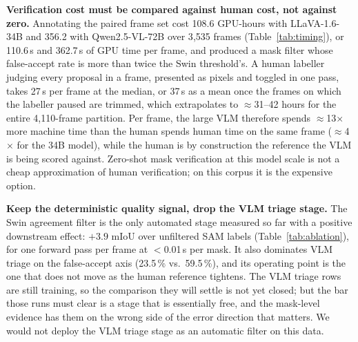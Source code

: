 \documentclass[conference]{IEEEtran}
\begin{document}
\textbf{Verification cost must be compared against human cost, not against zero.}
Annotating the paired frame set cost 108.6 GPU-hours with LLaVA-1.6-34B and 356.2 with
Qwen2.5-VL-72B over 3{,}535 frames (Table~\ref{tab:timing}), or 110.6\,s and 362.7\,s of GPU time per
frame, and produced a mask filter whose false-accept rate is more than twice the Swin threshold's.
A human labeller judging every proposal in a frame, presented as pixels and toggled in one pass, takes
27\,s per frame at the median, or 37\,s as a mean once the frames on which the labeller paused are
trimmed, which extrapolates to $\approx$31--42 hours for the entire 4{,}110-frame partition.
Per frame, the large VLM therefore spends $\approx$13$\times$ more machine time than the human
spends human time on the same frame ($\approx$4$\times$ for the 34B model), while the human is
by construction the reference the VLM is being scored against. Zero-shot mask verification at this model scale is not a cheap approximation of human
verification; on this corpus it is the expensive option.

\textbf{Keep the deterministic quality signal, drop the VLM triage stage.}
The Swin agreement filter is the only automated stage measured so far with a positive downstream
effect: $+3.9$ mIoU over unfiltered SAM labels (Table~\ref{tab:ablation}), for one forward pass per
frame at $<$0.01\,s per mask. It also dominates VLM triage on the false-accept axis
(23.5\,\% vs.\ 59.5\,\%), and its operating point is the one that does not move as the human reference
tightens. The VLM triage rows are still training, so the comparison they will settle is not yet
closed; but the bar those runs must clear is a stage that is essentially free, and the mask-level
evidence has them on the wrong side of the error direction that matters. We would not deploy the VLM
triage stage as an automatic filter on this data.
\end{document}
